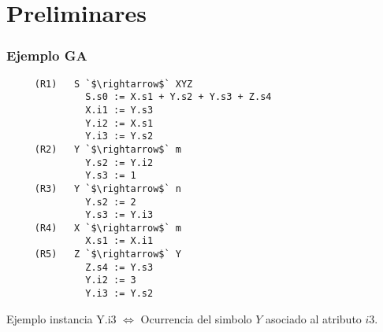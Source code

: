 \documentclass[10pt]{beamer}
\begin{document}
\section{Preliminares}
\begin{frame}[fragile]
\frametitle{Ejemplo GA}

\begin{lstlisting}
     (R1)   S `$\rightarrow$` XYZ      
              S.s0 := X.s1 + Y.s2 + Y.s3 + Z.s4
              X.i1 := Y.s3  
              Y.i2 := X.s1
              Y.i3 := Y.s2
     (R2)   Y `$\rightarrow$` m        
              Y.s2 := Y.i2
              Y.s3 := 1
     (R3)   Y `$\rightarrow$` n        
              Y.s2 := 2
              Y.s3 := Y.i3
     (R4)   X `$\rightarrow$` m        
              X.s1 := X.i1
     (R5)   Z `$\rightarrow$` Y        
              Z.s4 := Y.s3
              Y.i2 := 3
              Y.i3 := Y.s2
\end{lstlisting} 
\begin{block}{Ejemplo instancia}
 Y.i3 $\Leftrightarrow$ Ocurrencia del simbolo $Y$ asociado al atributo $i3$.
\end{block}

\end{frame}
\end{document}
